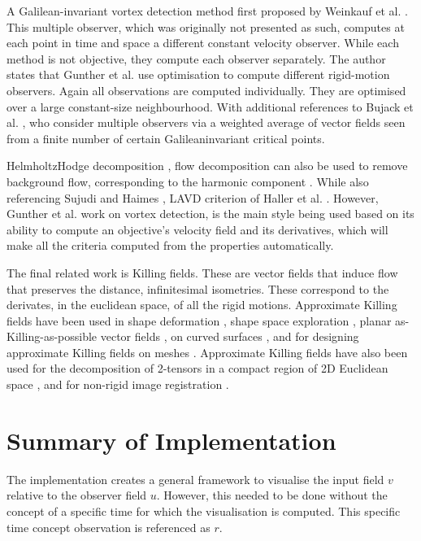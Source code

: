 \documentclass[a4paper,9pt]{article}
\begin{document}
A Galilean-invariant vortex detection method first proposed by Weinkauf et al. \cite{50}. This multiple observer, which was originally not presented as such, computes at each point in time and space a different constant velocity observer. While each method is not objective, they compute each observer separately. The author states that Gunther et al. \cite{17} use optimisation to compute different rigid-motion observers. Again all observations are computed individually. They are optimised over a large constant-size neighbourhood. With additional references to Bujack et al. \cite{10}, who consider multiple observers via a weighted average of vector fields seen from a finite number of certain Galileaninvariant critical points.

HelmholtzHodge decomposition \cite{7, 8}, flow decomposition can also be used to remove background flow, corresponding to the harmonic component \cite{9}. While also referencing Sujudi and Haimes \cite{44}, LAVD criterion of Haller et al. \cite{21}. However, Gunther et al. \cite{17, 18} work on vortex detection, is the main style being used based on its ability to compute an objective's velocity field and its derivatives, which will make all the criteria computed from the properties automatically.

The final related work is Killing fields. These are vector fields that induce flow that preserves the distance, infinitesimal isometries. These correspond to the derivates, in the euclidean space, of all the rigid motions. Approximate Killing fields have been used in shape deformation \cite{33}, shape space exploration \cite{28}, planar as-Killing-as-possible vector fields \cite{43}, on curved surfaces \cite{6}, and for designing approximate Killing fields on meshes \cite{3, 4}. Approximate Killing fields have also been used for the decomposition of 2-tensors in a compact region of 2D Euclidean space \cite{14}, and for non-rigid image registration \cite{13}.


\section{Summary of Implementation}

The implementation creates a general framework to visualise the input field $v$ relative to the observer field $u$. However, this needed to be done without the concept of a specific time for which the visualisation is computed. This specific time concept observation is referenced as $r$. 
\end{document}
